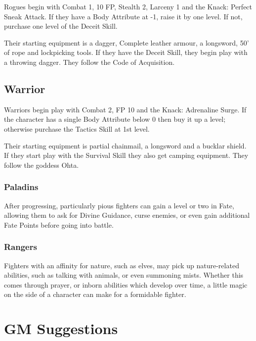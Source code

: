 \begin{multicols}{2}
Rogues begin with Combat 1, 10 FP, Stealth 2, Larceny 1 and the Knack: Perfect Sneak Attack.  If they have a Body Attribute at -1, raise it by one level.  If not, purchase one level of the Deceit Skill.

Their starting equipment is a dagger, Complete leather armour, a longsword, 50' of rope and lockpicking tools.  If they have the Deceit Skill, they begin play with a throwing dagger.  They follow the Code of Acquisition.

\subsection{Warrior}

Warriors begin play with Combat 2, FP 10 and the Knack: Adrenaline Surge.  If the character has a single Body Attribute below 0 then buy it up a level; otherwise purchase the Tactics Skill at 1st level.

Their starting equipment is partial chainmail, a longsword and a bucklar shield.  If they start play with the Survival Skill they also get camping equipment.  They follow the goddess Ohta.

\subsubsection{Paladins}

After progressing, particularly pious fighters can gain a level or two in Fate, allowing them to ask for Divine Guidance, curse enemies, or even gain additional Fate Points before going into battle.

\subsubsection{Rangers}

Fighters with an affinity for nature, such as elves, may pick up nature-related abilities, such as talking with animals, or even summoning mists.  Whether this comes through prayer, or inborn abilities which develop over time, a little magic on the side of a character can make for a formidable fighter.

\end{multicols}

\section{GM Suggestions}

